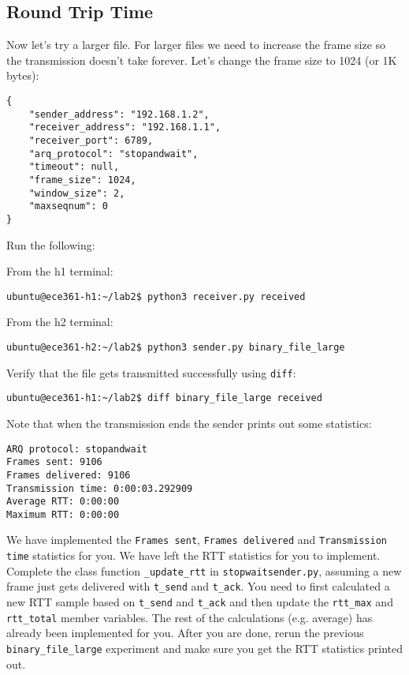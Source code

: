 \documentclass[11pt]{article}
\begin{document}
\subsection{Round Trip Time}
Now let's try a larger file. For larger files we need to increase the frame size so the transmission doesn't take forever. Let's change the frame size to 1024 (or 1K bytes):
\begin{lstlisting}[style=ece361-shell-base, caption={Configuration For Large File}]
{
    "sender_address": "192.168.1.2",
    "receiver_address": "192.168.1.1",
    "receiver_port": 6789,
    "arq_protocol": "stopandwait",
    "timeout": null,
    "frame_size": 1024,
    "window_size": 2,
    "maxseqnum": 0
}
\end{lstlisting}
Run the following:

From the h1 terminal:
\begin{lstlisting}[style=ece361-shell-base, caption={}]
ubuntu@ece361-h1:~/lab2$ python3 receiver.py received
\end{lstlisting}

From the h2 terminal:
\begin{lstlisting}[style=ece361-shell-base, caption={}]
ubuntu@ece361-h2:~/lab2$ python3 sender.py binary_file_large
\end{lstlisting}


Verify that the file gets transmitted successfully using \texttt{diff}:
\begin{lstlisting}[style=ece361-shell-base, caption={}]
ubuntu@ece361-h1:~/lab2$ diff binary_file_large received
\end{lstlisting}

Note that when the transmission ends the sender prints out some statistics:

\begin{lstlisting}[style=ece361-shell-base, caption={}]
ARQ protocol: stopandwait
Frames sent: 9106
Frames delivered: 9106
Transmission time: 0:00:03.292909
Average RTT: 0:00:00
Maximum RTT: 0:00:00
\end{lstlisting}

We have implemented the \texttt{Frames sent}, \texttt{Frames delivered} and \texttt{Transmission time} statistics for you.
We have left the RTT statistics for you to implement.
Complete the class function \texttt{\_update\_rtt} in \texttt{stopwaitsender.py}, assuming a new frame just gets delivered with \texttt{t\_send} and \texttt{t\_ack}.
You need to first calculated a new RTT sample based on \texttt{t\_send} and \texttt{t\_ack} and then update the \texttt{rtt\_max} and \texttt{rtt\_total} member variables.
The rest of the calculations (e.g. average) has already been implemented for you.
After you are done, rerun the previous \texttt{binary\_file\_large} experiment and make sure you get the RTT statistics printed out.
\end{document}
